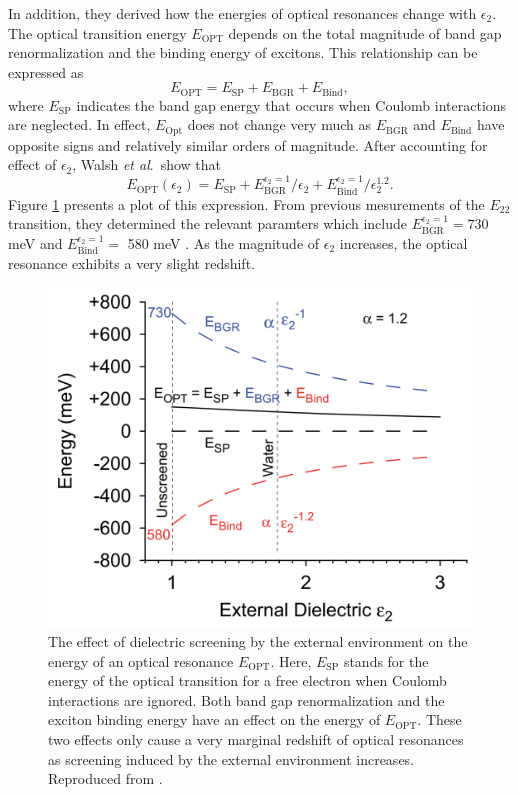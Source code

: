 In addition, they derived how the energies of optical resonances change with $\epsilon_2$. The optical transition energy $E_\text{OPT}$ depends on the total magnitude of band gap renormalization and the binding energy of excitons. This relationship can be expressed as%
%
\begin{equation}
	E_\text{OPT} = E_\text{SP} + E_\text{BGR} + E_\text{Bind},
\end{equation}
%
where $E_\text{SP}$ indicates the band gap energy that occurs when Coulomb interactions are neglected. In effect,  $E_\text{Opt}$ does not change very much as $ E_\text{BGR}$ and $E_\text{Bind}$ have opposite signs and relatively similar orders of magnitude. After accounting for effect of $\epsilon_2$, Walsh \textit{et al}.\ show that%
%
\begin{equation}
	E_\text{OPT}(\epsilon_2) = E_\text{SP} + E_\text{BGR}^{\epsilon_2 = 1}/\epsilon_2 + E_\text{Bind}^{\epsilon_2 = 1}/\epsilon_2^{1.2}.
\end{equation}
%
Figure \ref{fig:energy_shift_walsh} presents a plot of this expression. From previous mesurements of the $E_{22}$ transition, they determined the relevant paramters which include $E_\text{BGR}^{\epsilon_2 = 1} = 730$ meV and $E_\text{Bind}^{\epsilon_2 = 1} =$  580 meV \cite{walsh2007screening}. As the magnitude of $\epsilon_2$ increases, the optical resonance exhibits a very slight redshift.

\begin{figure}[ht]
	\centering
	\includegraphics[scale=0.25]{images/chapter_optical_props/dielectric_binding_walsh_2007}
	\caption{ The effect of dielectric screening by the external environment on the energy of an optical resonance $E_\text{OPT}$. Here, $E_\text{SP}$ stands for the energy of the optical transition for a free electron when Coulomb interactions are ignored. Both band gap renormalization and the exciton binding energy have an effect on the energy of $E_\text{OPT}$. These two effects only cause a very marginal redshift of optical resonances as screening induced by the external environment increases. Reproduced from \cite{walsh2008scaling}.}
	\label{fig:energy_shift_walsh}
\end{figure}

